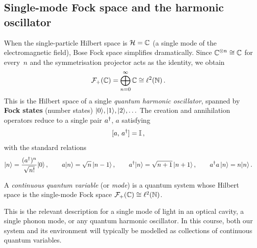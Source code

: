 

\subsection{Single-mode Fock space and the harmonic oscillator}%
\label{sec:single-mode}

When the single-particle Hilbert space is $\mathcal{H} = \mathbb{C}$ (a single mode
of the electromagnetic field), Bose Fock space simplifies dramatically.
Since $\mathbb{C}^{\otimes n} \cong \mathbb{C}$ for every~$n$ and the symmetrisation
projector acts as the identity, we obtain
\begin{equation}\label{eq:single-mode-fock-2}
  \mathcal{F}_+(\mathbb{C})
  = \bigoplus_{n=0}^{\infty} \mathbb{C}
  \cong \ell^2(\mathbb{N})\,.
\end{equation}
This is the Hilbert space of a single \emph{quantum harmonic
oscillator}, spanned by \textbf{Fock states} (number states)
$\lvert 0 \rangle, \lvert 1 \rangle, \lvert 2 \rangle, \ldots$ The creation and annihilation
operators reduce to a single pair $a^\dagger$, $a$ satisfying
\begin{equation}\label{eq:single-mode-ccr}
  [a,\, a^\dagger] = \mathbb{I}\,,
\end{equation}
with the standard relations
\begin{equation}\label{eq:fock-state-relations}
  \lvert n \rangle = \frac{(a^\dagger)^n}{\sqrt{n!}}\lvert 0 \rangle\,,\qquad
  a\lvert n \rangle = \sqrt{n}\,\lvert n-1 \rangle\,,\qquad
  a^\dagger\lvert n \rangle = \sqrt{n+1}\,\lvert n+1 \rangle\,,\qquad
  a^\dagger a\,\lvert n \rangle = n\lvert n \rangle\,.
\end{equation}

\begin{definition}\label{def:cqv}
  A \emph{continuous quantum variable} (or \emph{mode}) is a quantum
  system whose Hilbert space is the single-mode Fock space
  $\mathcal{F}_+(\mathbb{C}) \cong \ell^2(\mathbb{N})$.
\end{definition}

This is the relevant description for a single mode of light in an
optical cavity, a single phonon mode, or any quantum harmonic
oscillator.  In this course, both our system and its environment will
typically be modelled as collections of continuous quantum variables.

